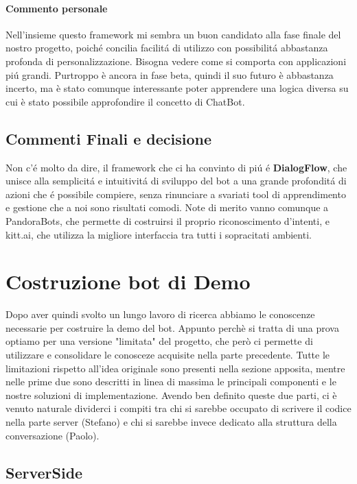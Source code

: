 \documentclass[]{article}
\begin{document}
\paragraph{Commento personale}
Nell’insieme questo framework mi sembra un buon candidato alla fase finale del nostro progetto, poiché concilia facilitá di utilizzo con possibilitá abbastanza profonda di personalizzazione. Bisogna vedere come si comporta con applicazioni piú grandi. Purtroppo è ancora in fase beta, quindi il suo futuro è abbastanza incerto, ma è stato comunque interessante poter apprendere una logica diversa su cui è stato possibile approfondire il concetto di ChatBot.


\subsection{Commenti Finali e decisione}
Non c'é molto da dire, il framework che ci ha convinto di piú é \textbf{DialogFlow}, che unisce alla semplicitá e intuitivitá di sviluppo del bot a una grande profonditá di azioni che é possibile compiere, senza rinunciare a svariati tool di apprendimento e gestione che a noi sono risultati comodi. Note di merito vanno comunque a PandoraBots, che permette di costruirsi il proprio riconoscimento d'intenti, e kitt.ai, che utilizza la migliore interfaccia tra tutti i sopracitati ambienti. 

\section{Costruzione bot di Demo}
Dopo aver quindi svolto un lungo lavoro di ricerca abbiamo le conoscenze necessarie per costruire la demo del bot. Appunto perchè si tratta di una prova optiamo per una versione "limitata" del progetto, che però ci permette di utilizzare e consolidare le conosceze acquisite nella parte precedente. Tutte le limitazioni rispetto all'idea originale sono presenti nella sezione apposita, mentre nelle prime due sono descritti in linea di massima le principali componenti e le nostre soluzioni di implementazione. Avendo ben definito queste due parti, ci è venuto naturale dividerci i compiti tra chi si sarebbe occupato di scrivere il codice nella parte server (Stefano) e chi si sarebbe invece dedicato alla struttura della conversazione (Paolo).

\subsection{ServerSide}
\end{document}
